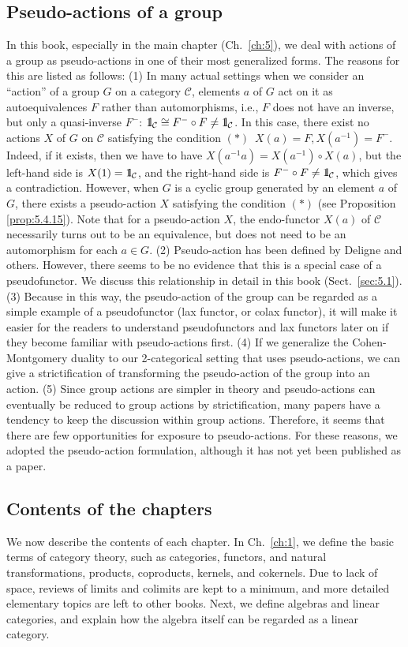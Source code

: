 \documentclass{surv-l}
\numberwithin{equation}{chapter}
\numberwithin{figure}{chapter}
\theoremstyle{plain}
\theoremstyle{definition}
\theoremstyle{remark}
\newcommand{\id}{1\kern-.25em{\text{{\rm l}}}}
\begin{document}
\subsection*{Pseudo-actions of a group}
In this book, especially in the main chapter (Ch.\ \ref{ch:5}),
we deal with actions of a group as pseudo-actions in one of their most generalized forms.
The reasons for this are listed as follows:
(1) In many actual settings when we consider an ``action'' of a group $G$
on a category ${\mathcal{C}}$, elements $a$ of $G$ act on it as autoequivalences $F$
rather than automorphisms, i.e., $F$ does not have an inverse,
but only a quasi-inverse $F^-$: $\id_{\mathcal{C}} \cong F^- \circ F \ne \id_{\mathcal{C}}$.
In this case, there exist no actions $X$ of $G$ on ${\mathcal{C}}$ satisfying the condition
$(*)$\  $X(a)=F, X(a^{-1})= F^-$.
Indeed, if it exists, then we have to have $X(a^{-1} a) = X(a^{-1})\circ X(a)$,
but the left-hand side is $X(1) = \id_{\mathcal{C}}$, and
the right-hand side is $F^- \circ F \ne \id_{\mathcal{C}}$, which gives a contradiction.
However, when $G$ is a cyclic group generated by an element $a$ of $G$,
there exists a pseudo-action $X$ satisfying the condition $(*)$
(see Proposition \ref{prop:5.4.15}).
Note that for a pseudo-action $X$,
the endo-functor $X(a)$ of ${\mathcal{C}}$ necessarily turns out to be
an equivalence, but does not need to be an automorphism for each $a \in G$.
(2) Pseudo-action has been defined by Deligne and others.
However, there seems to be no evidence that this is a special case
of a pseudofunctor. We discuss this relationship in detail in this book (Sect.\ \ref{sec:5.1}).
(3) Because in this way, the pseudo-action of the group can be regarded as a simple example of a pseudofunctor (lax functor, or colax functor), it will make it easier for the readers to understand pseudofunctors and lax functors later on if they become familiar with pseudo-actions first.
(4) If we generalize the Cohen-Montgomery duality to our 2-categorical setting
that uses pseudo-actions,
we can give a strictification of transforming the pseudo-action of the group into an action.
(5) Since group actions are simpler in theory and pseudo-actions can eventually be reduced to group actions by strictification, many papers have a tendency to keep the discussion within group actions. Therefore, it seems that there are few opportunities for exposure to pseudo-actions.
For these reasons, we adopted the pseudo-action formulation, although it has not yet been published as a paper.

\subsection*{Contents of the chapters}
We now describe the contents of each chapter.
In Ch.\  \ref{ch:1}, we define the basic terms of category theory, such as
categories, functors, and natural transformations, products, coproducts, kernels, and cokernels.
Due to lack of space, reviews of limits and colimits are kept to a minimum,
and more detailed elementary topics are left to other books.
Next, we define algebras and linear categories, and
explain how the algebra itself can be regarded as a linear category.
\end{document}
